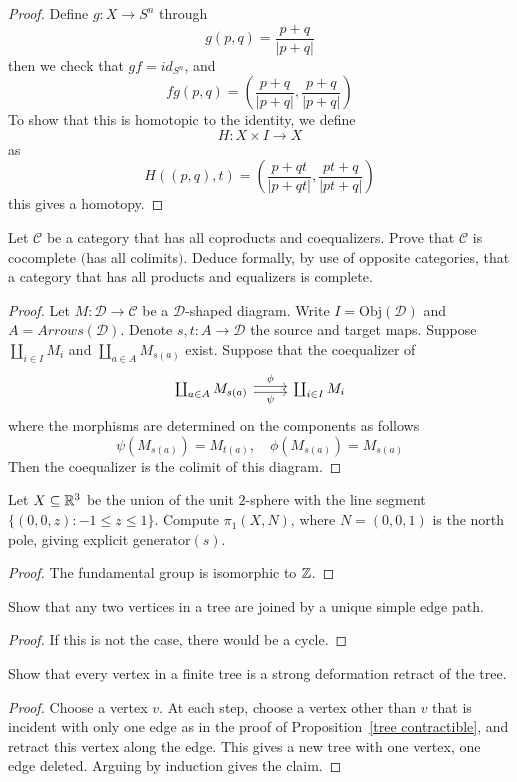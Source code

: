 \begin{proof}
Define $g:X\to S^n$ through
\[g(p,q)=\dfrac{p+q}{|p+q|}\]
then we check that $gf=id_{S^n}$, and
\[fg(p,q)=(\dfrac{p+q}{|p+q|},\dfrac{p+q}{|p+q|})\]
To show that this is homotopic to the identity, we define
\[H:X\times I\to X\]
as
\[H((p,q),t)=(\dfrac{p+qt}{|p+qt|},\dfrac{pt+q}{|pt+q|})\]
this gives a homotopy.
\end{proof}
\begin{exercise}
Let $\mathcal{C}$ be a category that has all coproducts and coequalizers. Prove that $\mathcal{C}$ is cocomplete $($has all colimits$)$. Deduce formally, by use of opposite categories, that a category that has all products and equalizers is complete.
\end{exercise}
\begin{proof}
Let $M:\mathcal{D}\to\mathcal{C}$ be a $\mathcal{D}$-shaped diagram. Write $I=\mathrm{Obj}(\mathcal{D})$ and $A=Arrows(\mathcal{D})$. Denote $s,t:A\to\mathcal{D}$ the source and target maps. Suppose $\coprod_{i\in I}M_i$ and $\coprod_{a\in A}M_{s(a)}$ exist. Suppose that the coequalizer of
\[\begin{tikzcd}
\coprod_{a\in A}M_{s(a)}\ar[r,shift left=0.5ex,"\phi"]\ar[r,shift right=0.5ex,swap,"\psi"]&\coprod_{i\in I}M_i
\end{tikzcd}\]
where the morphisms are determined on the components as follows
\[\psi(M_{s(a)})=M_{t(a)},\quad \phi(M_{s(a)})=M_{s(a)}\]
Then the coequalizer is the colimit of this diagram.
\end{proof}
\begin{exercise}
Let $X\subseteq\mathbb{R}^3$ be the union of the unit $2$-sphere with the line segment $\{(0,0,z):-1\leq z\leq 1\}$. Compute $\pi_1(X,N)$, where $N=(0,0,1)$ is the north pole, giving explicit generator$(s)$.
\end{exercise}
\begin{proof}
The fundamental group is isomorphic to $\mathbb{Z}$.
\end{proof}
\begin{exercise}
Show that any two vertices in a tree are joined by a unique simple edge path.
\end{exercise}
\begin{proof}
If this is not the case, there would be a cycle.
\end{proof}
\begin{exercise}\label{tree stong}
Show that every vertex in a finite tree is a strong deformation retract of the tree.
\end{exercise}
\begin{proof}
Choose a vertex $v$. At each step, choose a vertex other than $v$ that is incident with only one edge as in the proof of Proposition~\ref{tree contractible}, and retract this vertex along the edge. This gives a new tree with one vertex, one edge deleted. Arguing by induction gives the claim.
\end{proof}
